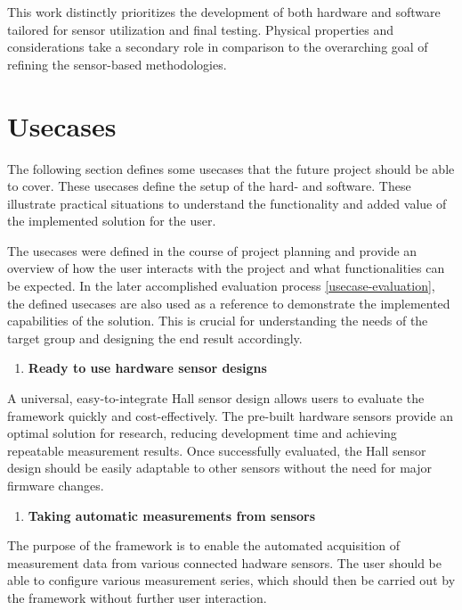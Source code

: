 This work distinctly prioritizes the development of both hardware and
software tailored for sensor utilization and final testing. Physical
properties and considerations take a secondary role in comparison to the
overarching goal of refining the sensor-based methodologies.

\hypertarget{usecases}{%
\section{Usecases}\label{usecases}}

The following section defines some usecases that the future project
should be able to cover. These usecases define the setup of the hard-
and software. These illustrate practical situations to understand the
functionality and added value of the implemented solution for the user.

The usecases were defined in the course of project planning and provide
an overview of how the user interacts with the project and what
functionalities can be expected. In the later accomplished evaluation
process \ref{usecase-evaluation}, the defined usecases are also used as
a reference to demonstrate the implemented capabilities of the solution.
This is crucial for understanding the needs of the target group and
designing the end result accordingly.

\begin{enumerate}
\def\labelenumi{\arabic{enumi}.}
\tightlist
\item
  \textbf{Ready to use hardware sensor designs}
\end{enumerate}

A universal, easy-to-integrate Hall sensor design allows users to
evaluate the framework quickly and cost-effectively. The pre-built
hardware sensors provide an optimal solution for research, reducing
development time and achieving repeatable measurement results. Once
successfully evaluated, the Hall sensor design should be easily
adaptable to other sensors without the need for major firmware changes.

\begin{enumerate}
\def\labelenumi{\arabic{enumi}.}
\setcounter{enumi}{1}
\tightlist
\item
  \textbf{Taking automatic measurements from sensors}
\end{enumerate}

The purpose of the framework is to enable the automated acquisition of
measurement data from various connected hadware sensors. The user should
be able to configure various measurement series, which should then be
carried out by the framework without further user interaction.

